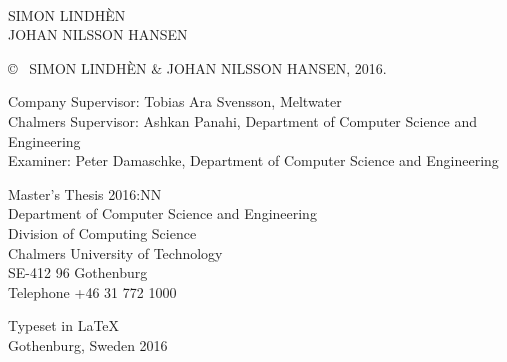\newpage
\thispagestyle{plain}
\vspace*{4.5cm}
\maintitle\\
\subtitle\\
SIMON LINDHÈN\\
JOHAN NILSSON HANSEN\setlength{\parskip}{1cm}



\copyright ~ SIMON LINDHÈN \& JOHAN NILSSON HANSEN, 2016. \setlength{\parskip}{1cm}

Company Supervisor: Tobias Ara Svensson, Meltwater\\
Chalmers Supervisor: Ashkan Panahi, Department of Computer Science and Engineering\\
Examiner: Peter Damaschke, Department of Computer Science and Engineering \setlength{\parskip}{1cm}

Master's Thesis 2016:NN\\	%
Department of Computer Science and Engineering\\
Division of Computing Science\\
Chalmers University of Technology\\
SE-412 96 Gothenburg\\
Telephone +46 31 772 1000 \setlength{\parskip}{0.5cm}

\vfill
 \setlength{\parskip}{0.5cm}

Typeset in \LaTeX \\
Gothenburg, Sweden 2016

